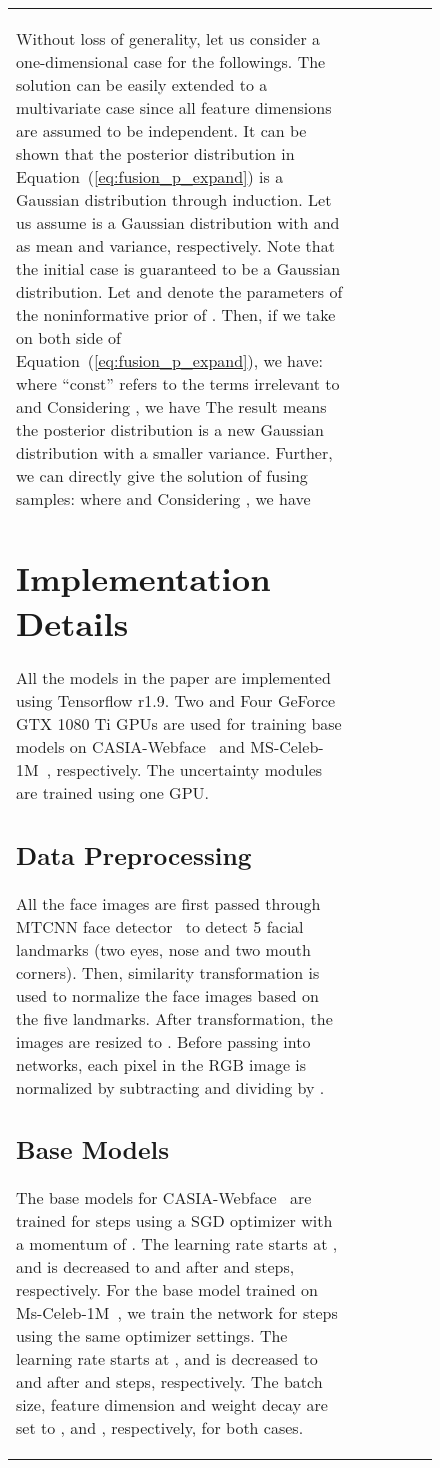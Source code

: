 \documentclass[10pt,twocolumn,letterpaper]{article}
\begin{document}
\begin{figure}[t]
\begin{table}[t]
\begin{center}
\begin{tabularx}{1.00\linewidth}{Xc cccc}
Without loss of generality, let us consider a one-dimensional case for the followings. The solution can be easily extended to a multivariate case since all feature dimensions are assumed to be independent. It can be shown that the posterior distribution in Equation~(\ref{eq:fusion_p_expand}) is a Gaussian distribution through induction. Let us assume  is a Gaussian distribution with  and  as mean and variance, respectively. Note that the initial case  is guaranteed to be a Gaussian distribution.
Let  and  denote the parameters of the noninformative prior of . Then, if we take  on both side of Equation~(\ref{eq:fusion_p_expand}), we have:
\vspace{-0.3em}
where ``const'' refers to the terms irrelevant to  and
\vspace{-0.3em}
Considering , we have
\vspace{-0.3em}
The result means the posterior distribution is a new Gaussian distribution with a smaller variance. Further, we can directly give the solution of fusing  samples:
\vspace{-0.3em}
where  and
\vspace{-0.3em}
Considering , we have


\section{Implementation Details}
\label{sec:detail}
All the models in the paper are implemented using Tensorflow r1.9. Two and Four GeForce GTX 1080 Ti GPUs are used for training base models on CASIA-Webface~\cite{CASIA-WebFace} and MS-Celeb-1M~\cite{MS-CELEB}, respectively. The uncertainty modules are trained using one GPU.

\subsection{Data Preprocessing}
All the face images are first passed through MTCNN face detector~\cite{MTCNN} to detect 5 facial landmarks (two eyes, nose and two mouth corners). Then, similarity transformation is used to normalize the face images based on the five landmarks. After transformation, the images are resized to . Before passing into networks, each pixel in the RGB image is normalized by subtracting  and dividing by . 

\subsection{Base Models}
The base models for CASIA-Webface~\cite{CASIA-WebFace} are trained for  steps using a SGD optimizer with a momentum of . The learning rate starts at , and is decreased to  and  after  and  steps, respectively. For the base model trained on Ms-Celeb-1M~\cite{MS-CELEB}, we train the network for  steps using the same optimizer settings. The learning rate starts at , and is decreased to  and  after  and  steps, respectively. The batch size, feature dimension and weight decay are set to ,  and , respectively, for both cases.


\end{tabularx}
\end{center}
\end{table}
\end{figure}
\end{document}
